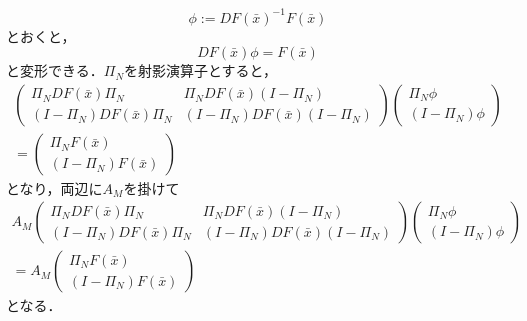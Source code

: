 \begin{equation*}
  \phi:=DF(\bar{x})^{-1} F(\bar{x})
\end{equation*}
とおくと，
\begin{equation*}
  DF(\bar{x}) \phi = F(\bar{x})
\end{equation*}
と変形できる．$\Pi_N$を射影演算子とすると，
\begin{equation}
    \begin{split}
    \begin{pmatrix}
      \Pi_N DF(\bar{x}) \Pi_N & \Pi_N DF(\bar{x}) (I-\Pi_N) \\
      (I-\Pi_N) DF(\bar{x}) \Pi_N & (I-\Pi_N) DF(\bar{x}) (I-\Pi_N)
    \end{pmatrix}
    \begin{pmatrix}
      \Pi_N \phi \\
      (I-\Pi_N) \phi
    \end{pmatrix}
    \\=
    \begin{pmatrix}
      \Pi_N F(\bar{x}) \\
      (I - \Pi_N) F(\bar{x})
    \end{pmatrix}
  \end{split}
\end{equation}
となり，両辺に$A_M$を掛けて
\begin{equation}
  \label{eq:y0-1}
  \begin{split}
  A_M
    \begin{pmatrix}
      \Pi_N DF(\bar{x}) \Pi_N & \Pi_N DF(\bar{x}) (I-\Pi_N) \\
      (I-\Pi_N) DF(\bar{x}) \Pi_N & (I-\Pi_N) DF(\bar{x}) (I-\Pi_N)
    \end{pmatrix}
    \begin{pmatrix}
      \Pi_N \phi \\
      (I-\Pi_N) \phi
    \end{pmatrix}
    \\=A_M
    \begin{pmatrix}
      \Pi_N F(\bar{x}) \\
      (I - \Pi_N) F(\bar{x})
    \end{pmatrix}
  \end{split}
\end{equation}
となる．

